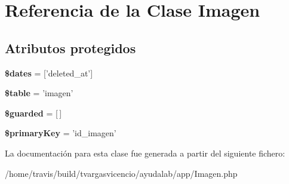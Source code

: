 \hypertarget{class_app_1_1_imagen}{\section{\-Referencia de la \-Clase \-Imagen}
\label{class_app_1_1_imagen}
}
\subsection*{\-Atributos protegidos}
\begin{DoxyCompactItemize}
\item 
\hypertarget{class_app_1_1_imagen_aab581066837d6296ba35c72937b6fc1c}{{\bfseries \$dates} = \mbox{[}'deleted\-\_\-at'\mbox{]}}\label{class_app_1_1_imagen_aab581066837d6296ba35c72937b6fc1c}

\item 
\hypertarget{class_app_1_1_imagen_ae8876a14058f368335baccf35af4a22b}{{\bfseries \$table} = 'imagen'}\label{class_app_1_1_imagen_ae8876a14058f368335baccf35af4a22b}

\item 
\hypertarget{class_app_1_1_imagen_a5758640ec23bdc1a6850649763244e86}{{\bfseries \$guarded} = \mbox{[}$\,$\mbox{]}}\label{class_app_1_1_imagen_a5758640ec23bdc1a6850649763244e86}

\item 
\hypertarget{class_app_1_1_imagen_a927b0256b942a3ee89485f2649af7981}{{\bfseries \$primary\-Key} = 'id\-\_\-imagen'}\label{class_app_1_1_imagen_a927b0256b942a3ee89485f2649af7981}

\end{DoxyCompactItemize}


\-La documentación para esta clase fue generada a partir del siguiente fichero\-:\begin{DoxyCompactItemize}
\item 
/home/travis/build/tvargasvicencio/ayudalab/app/\-Imagen.\-php\end{DoxyCompactItemize}
